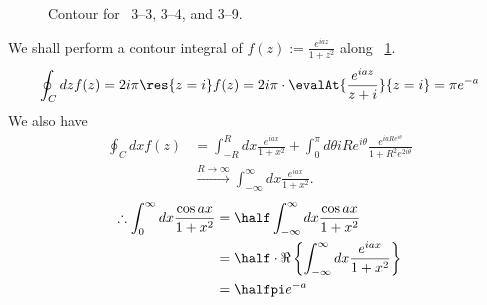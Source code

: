 \item

\begin{figure}[ht]
	\centering
	\caption{Contour for ~3--3, 3--4, and 3--9.}%
	\label{fig:problem3-3}
\end{figure}

We shall perform a contour integral of $f(z) := \frac{e^{iaz}}{1 + z^2}$ along ~\ref{fig:problem3-3}.
\[
	\oint_C dz f(z)
	= 2i\pi \res{z = i} f(z)
	= 2i\pi \cdot \evalAt{\frac{e^{iaz}}{z + i}}{z = i}
	= \pi e^{-a}
\]
We also have
\begin{align*}
	\oint_C dx f(z)
	 & = \int_{-R}^{R} dx \frac{e^{iax}}{1 + x^2}
	+\int_0^{\pi} d\theta iRe^{i\theta} \frac{e^{iaRe^{i\theta}}}{1 + R^2 e^{2i\theta}}       \\
	 & \xrightarrow{R \rightarrow \infty} \int_{-\infty}^{\infty} dx \frac{e^{iax}}{1 + x^2}.
\end{align*}
\begin{align*}
	\therefore \int_{0}^{\infty} dx \frac{\cos ax}{1 + x^2}
	 & = \half \int_{-\infty}^{\infty} dx \frac{\cos ax}{1 + x^2}                            \\
	 & = \half \cdot \Re \left\{ \int_{-\infty}^{\infty} dx \frac{e^{iax}}{1 + x^2} \right\} \\
	 & = \halfpi e^{-a}
\end{align*}